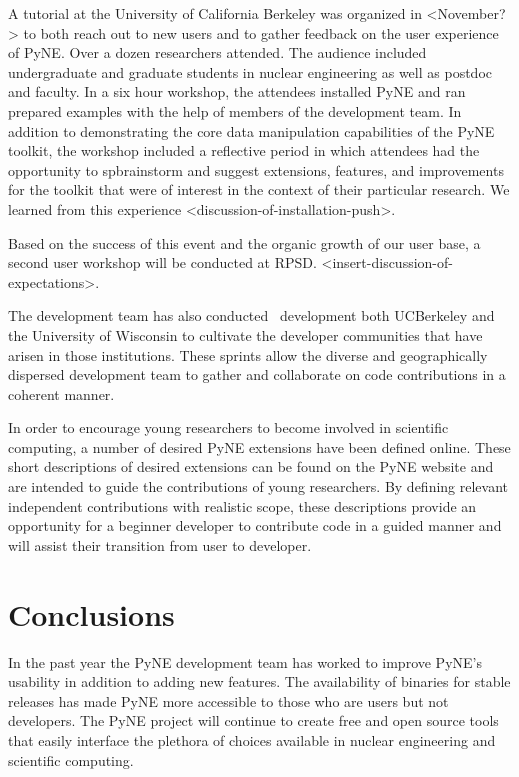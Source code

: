 \documentclass{anstrans}
\begin{document}
A tutorial at the University of California Berkeley was organized in <November?> to both reach out to new users and to gather feedback on the user experience of PyNE. Over a dozen researchers attended. The audience included undergraduate and graduate students in nuclear engineering as well as postdoc and faculty. In a six hour workshop, the attendees installed PyNE and ran prepared examples with the help of members of the development team. In addition to demonstrating the core data manipulation capabilities of the PyNE toolkit, the workshop included a reflective period in which attendees had the opportunity to spbrainstorm and suggest extensions, features, and improvements for the toolkit that were of interest in the context of their particular research. We learned from this experience <discussion-of-installation-push>.

Based on the success of this event and the organic growth of our user base, a second user workshop will be conducted at RPSD. <insert-discussion-of-expectations>.

The development team has also conducted  development both UCBerkeley and the University of Wisconsin to cultivate the developer communities that have arisen in those institutions. These sprints allow the diverse and geographically dispersed development team to gather and collaborate on code contributions in a coherent manner. 

In order to encourage young researchers to become involved in scientific computing, a number of desired PyNE extensions have been defined online. These short descriptions of desired extensions can be found on the PyNE website and are intended to guide the contributions of young researchers. By defining relevant independent contributions with realistic scope, these descriptions provide an opportunity for a beginner developer to contribute code in a guided manner and will assist their transition from user to developer. 

\section{Conclusions}

In the past year the PyNE development team has worked to improve PyNE's usability in addition to adding new features. The availability of binaries for stable releases has made PyNE more accessible to those who are users but not developers. The PyNE project will continue to create free and open source tools that easily interface the plethora of choices available in nuclear engineering and scientific computing. 

 
 
\end{document}
